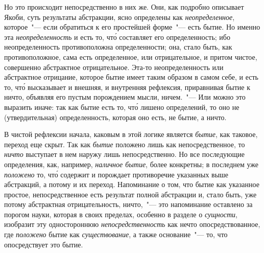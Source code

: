 Но это происходит непосредственно в них же. Они,
как подробно описывает Якоби, суть результаты абстракции,
ясно определены как \emph{неопределенное}, которое~"--- если
обратиться к его простейшей форме~"--- есть бытие. Но
именно эта \emph{неопределенность} и есть то, чт\'о составляет
его определенность; ибо неопределенность противоположна
определенности; она, стало быть, как противоположное,
сама есть определенное, или отрицательное, и
притом чистое, совершенно абстрактное отрицательное.
Эта-то неопределенность или абстрактное отрицание, которое
бытие имеет таким образом в самом себе, и есть то,
чт\'о высказывает и внешняя, и внутренняя рефлексия,
приравнивая бытие к ничто, объявляя его пустым порождением
мысли, ничем.~"--- Или можно это выразить
иначе: так как бытие есть то, чт\'о лишено определений, то
оно не (утвердительная) определенность, которая оно
есть, не бытие, а ничто.

В чистой рефлексии начала, каковым в этой логике
является \emph{бытие}, как таковое, переход еще скрыт. Так как
\emph{бытие} положено лишь как непосредственное, то \emph{ничто}
выступает в нем наружу лишь непосредственно. Но все
последующие определения, как, например, \emph{наличное бытие},
более конкретны; в последнем уже \emph{положено} то, чт\'о
содержит и порождает противоречие указанных выше
абстракций, а потому и их переход. Напоминание о том,
что бытие как указанное простое, непосредственное есть
результат полной абстракции и, стало быть, уже потому
абстрактная отрицательность, ничто,~"--- это напоминание
оставлено за порогом науки, которая в своих пределах,
особенно в разделе о \emph{сущности}, изобразит эту одностороннюю
\emph{непосредственность} как нечто опосредствованное,
где \emph{положено} бытие как \emph{существование}, а также основание~"---
то, что опосредствует это бытие.

